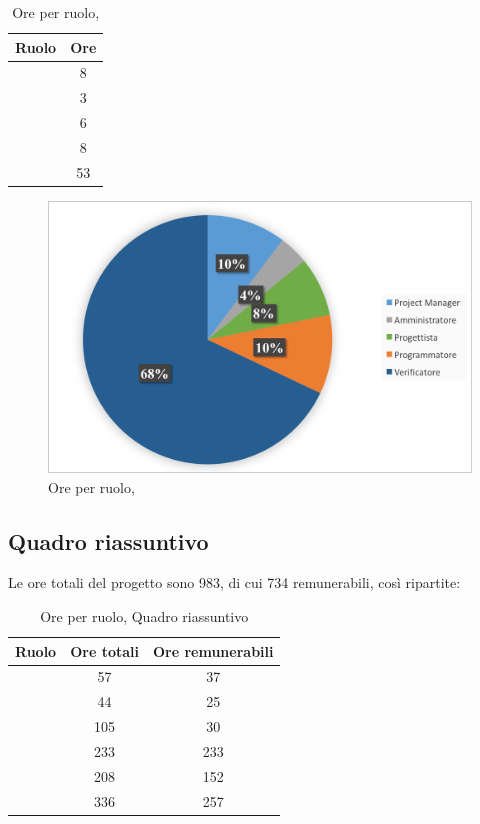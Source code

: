 \begin{table}[h]
	\begin{center}
		\begin{tabular}{|c|c|}
			\hline
			\textbf{Ruolo}	& \textbf{Ore} \\
			\hline
			\Pm &	8\\
			\hline
			\Am	&	3\\
			\hline
			\Prog		&	6\\
			\hline
			\Progr & 8\\
			\hline
			\Ver	&	53\\
			\hline
		\end{tabular}
	\end{center}
	\caption{Ore per ruolo, \VV}
\end{table}

\begin{figure}[H]
	\centering 
	\includegraphics[scale=0.7]{Immagini/GraficiTorte/VV.png}
	\caption{Ore per ruolo, \VV}
\end{figure}
\newpage
\subsection{Quadro riassuntivo}
Le ore totali del progetto sono 983, di cui 734 remunerabili, così ripartite:

\begin{table}[h]
	\begin{center}
		\begin{tabular}{|c|c|c|}
			\hline
			\textbf{Ruolo}	& \textbf{Ore totali} & \textbf{Ore remunerabili} \\
			\hline
			\Pm &	57	&	37	\\
			\hline
			\Am	&	44	&	25	\\
			\hline
			\An		&	105	&	30	\\
			\hline
			\Prog		&	233	&	233	\\
			\hline
			\Progr	&	208	&	152	\\
			\hline
			\Ver	&	336	&	257	\\
			\hline
		\end{tabular}
	\end{center}
	\caption{Ore per ruolo, Quadro riassuntivo}
\end{table}

